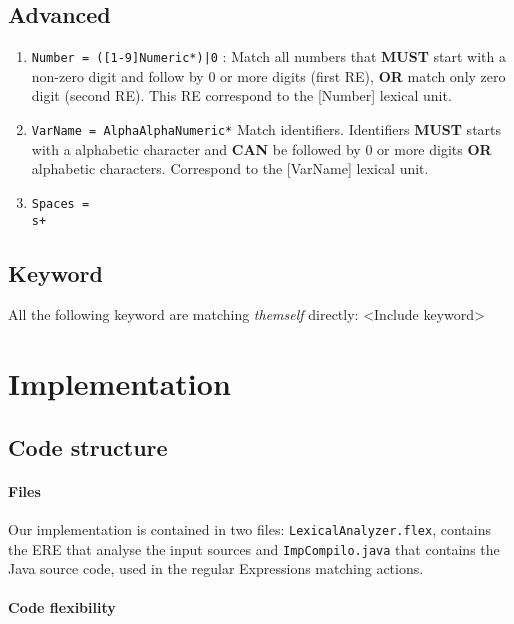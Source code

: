 \documentclass[letterpaper]{article}
\begin{document}
\subsection{Advanced}
\label{advanced-ere}
\begin{enumerate}
    \item \texttt{Number = ([1-9]{Numeric}*)|0} :
    Match all numbers that \textbf{MUST} start with a non-zero digit and follow
    by 0 or more digits (first RE),
    \textbf{OR} match only zero digit (second RE). This RE correspond to
    the [Number] lexical unit.
    \item \texttt{VarName = {Alpha}{AlphaNumeric}*}
    Match identifiers. Identifiers \textbf{MUST} starts with a alphabetic
    character and \textbf{CAN} be followed by 0 or more digits \textbf{OR}
    alphabetic characters.
    Correspond to the [VarName] lexical unit.
    \item \texttt{Spaces = \\s+}
\end{enumerate}

\subsection{Keyword}

\label{ere-keywords}

All the following keyword are matching \textit{themself} directly: <Include
keyword>

\section{Implementation}

\subsection{Code structure}

\paragraph{Files}

Our implementation is contained in two files: \texttt{LexicalAnalyzer.flex},
contains the ERE that analyse the input sources and \texttt{ImpCompilo.java}
that contains the Java source code, used in the regular Expressions
matching actions.


\paragraph{Code flexibility}
\end{document}
